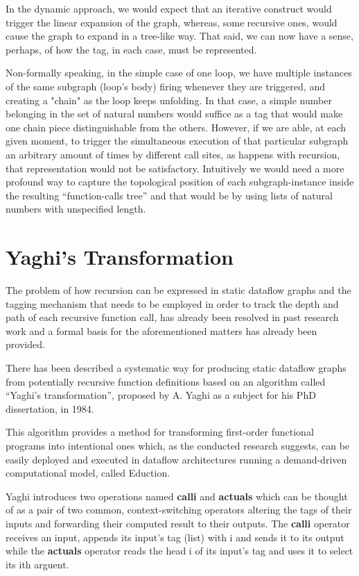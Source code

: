 \documentclass[ack,preface]{dithesis}
\begin{document}
In the dynamic approach, we would expect that an iterative construct would trigger the linear expansion of the graph, whereas, some recursive ones, would cause the graph to expand in a tree-like way. That said, we can now have a sense, perhaps, of how the tag, in each case, must be represented. 

Non-formally speaking, in the simple case of one  loop, we have multiple instances of the same subgraph (loop’s body) firing whenever they are triggered, and creating a "chain" as the loop keeps unfolding. In that case, a simple number belonging in the set of natural numbers would suffice as a tag that would make one chain piece distinguishable from the others. However, if we are able, at each given moment, to trigger the simultaneous execution of that particular subgraph an arbitrary amount of times by different call sites, as happens with recursion, that representation would not be satisfactory. Intuitively we would need a more profound way to capture the topological position of each subgraph-instance inside the resulting “function-calls tree” and that would be by using lists of natural numbers with unspecified length.

    \section{Yaghi's Transformation}
The problem of how recursion can be expressed in static dataflow graphs and the tagging mechanism that needs to be employed in order to track the depth and path of each recursive function call, has already been resolved in past research work and a formal basis for the aforementioned matters has already been provided.  \cite{Rondogiannis:1997}

There has been described a systematic way for producing static dataflow graphs from potentially recursive function definitions based on an algorithm called “Yaghi’s transformation”, proposed by A. Yaghi as a subject for his PhD dissertation, in 1984.

This algorithm provides a method for transforming first-order functional programs into intentional ones which, as the conducted research suggests, can be easily deployed and executed in dataflow architectures running a demand-driven computational model, called Eduction.

Yaghi introduces two operations named \textbf{calli} and \textbf{actuals} which can be thought of as a pair of two common, context-switching operators altering the tags of their inputs and forwarding their computed result to their outputs. The \textbf{calli} operator receives an input, appends its input's tag (list) with i and sends it to its output while the \textbf{actuals} operator reads the head i of its input's tag and uses it to select its ith arguent.
\end{document}
